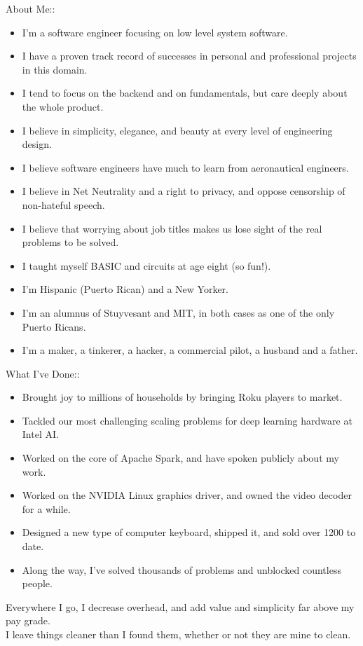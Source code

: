 About Me::

\begin{itemize}
\item I'm a software engineer focusing on low level system software.
\item I have a proven track record of successes in personal and professional projects in this domain.
\item I tend to focus on the backend and on fundamentals, but care deeply about the whole product.
\item I believe in simplicity, elegance, and beauty at every level of engineering design.
\item I believe software engineers have much to learn from aeronautical engineers.
\item I believe in Net Neutrality and a right to privacy, and oppose censorship of non-hateful speech.
\item I believe that worrying about job titles makes us lose sight of the real problems to be solved.
\item I taught myself BASIC and circuits at age eight (so fun!).
\item I'm Hispanic (Puerto Rican) and a New Yorker.
\item I'm an alumnus of Stuyvesant and MIT, in both cases as one of the only Puerto Ricans.
\item I'm a maker, a tinkerer, a hacker, a commercial pilot, a husband and a father.
\end{itemize}

What I've Done::

\begin{itemize}
\item Brought joy to millions of households by bringing Roku players to market.
\item Tackled our most challenging scaling problems for deep learning hardware at Intel AI.
\item Worked on the core of Apache Spark, and have spoken publicly about my work.
\item Worked on the NVIDIA Linux graphics driver, and owned the video decoder for a while.
\item Designed a new type of computer keyboard, shipped it, and sold over 1200 to date.
\item Along the way, I've solved thousands of problems and unblocked countless people.
\end{itemize}

Everywhere I go, I decrease overhead, and add value and simplicity far above my pay grade.\\
I leave things cleaner than I found them, whether or not they are mine to clean.


